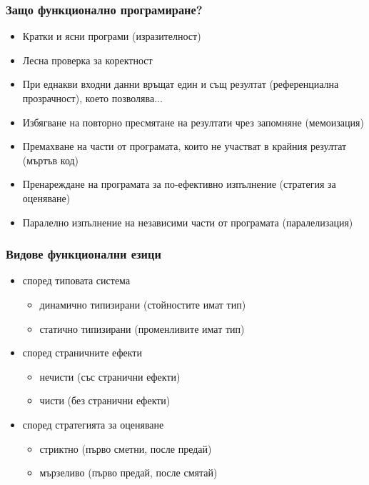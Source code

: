\documentclass{beamer}
\begin{document}
\begin{frame}
  \frametitle{Защо функционално програмиране?}

  \begin{itemize}[<+->]
  \item Кратки и ясни програми (изразителност)
  \item Лесна проверка за коректност
  \item При еднакви входни данни връщат един и същ резултат (референциална прозрачност), \onslide<+-> което позволява...
  \item Избягване на повторно пресмятане на резултати чрез запомняне (мемоизация)
  \item Премахване на части от програмата, които не участват в крайния резултат (мъртъв код)
  \item Пренареждане на програмата за по-ефективно изпълнение (стратегия за оценяване)
  \item Паралелно изпълнение на независими части от програмата (паралелизация)
  \end{itemize}
\end{frame}

\begin{frame}[<1-2>]
  \frametitle{Видове функционални езици}

  \begin{itemize}
  \item според типовата система
    \begin{itemize}
    \item динамично типизирани (стойностите имат тип) 
    \item статично типизирани (променливите имат тип) 
    \end{itemize}
  \item според страничните ефекти
    \begin{itemize}
    \item нечисти (със странични ефекти) 
    \item чисти (без странични ефекти) 
    \end{itemize}
  \item според стратегията за оценяване
    \begin{itemize}
    \item стриктно (първо сметни, после предай)  
    \item мързеливо (първо предай, после смятай) 
    \end{itemize}
  \end{itemize}

  \pause
\end{frame}
\end{document}
